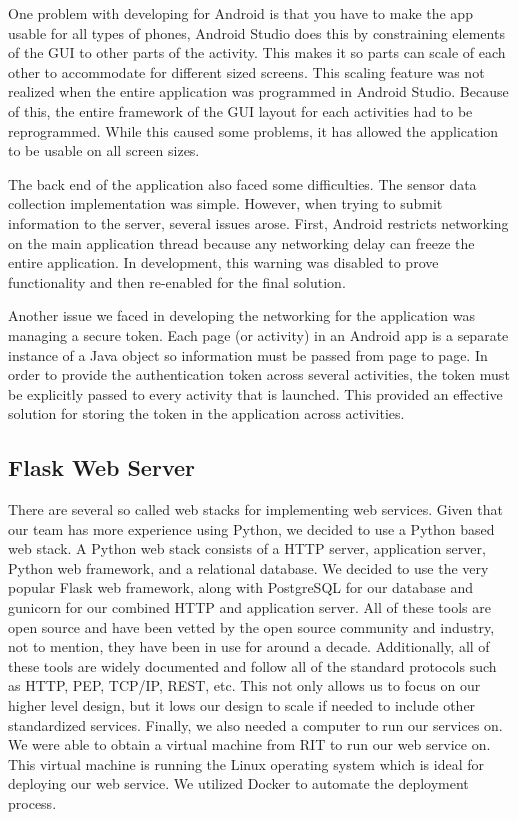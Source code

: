 \documentclass[conference]{IEEEtran}
\begin{document}
One problem with developing for Android is that you have to make the app usable for all types of phones, Android Studio does this by constraining elements of the GUI to other parts of the activity. This makes it so parts can scale of each other to accommodate for different sized screens. This scaling feature was not realized when the entire application was programmed in Android Studio. Because of this, the entire framework of the GUI layout for each activities had to be reprogrammed. While this caused some problems, it has allowed the application to be usable on all screen sizes.

The back end of the application also faced some difficulties. The sensor data collection implementation was simple. However, when trying to submit information to the server, several issues arose. First, Android restricts networking on the main application thread because any networking delay can freeze the entire application. In development, this warning was disabled to prove functionality and then re-enabled for the final solution. 

Another issue we faced in developing the networking for the application was managing a secure token. Each page (or activity) in an Android app is a separate instance of a Java object so information must be passed from page to page. In order to provide the authentication token across several activities, the token must be explicitly passed to every activity that is launched. This provided an effective solution for storing the token in the application across activities. 

\subsection{Flask Web Server}

There are several so called web stacks for implementing web services. Given that our team has more experience using Python, we decided to use a Python based web stack. A Python web stack consists of a HTTP server, application server, Python web framework, and a relational database. We decided to use the very popular Flask web framework, along with PostgreSQL for our database and gunicorn for our combined HTTP and application server. All of these tools are open source and have been vetted by the open source community and industry, not to mention, they have been in use for around a decade. Additionally, all of these tools are widely documented and follow all of the standard protocols such as HTTP, PEP, TCP/IP, REST, etc. This not only allows us to focus on our higher level design, but it 
lows our design to scale if needed to include other standardized services. Finally, we also needed a computer to run our services on. We were able to obtain a virtual machine from RIT to run our web service on. This virtual machine is running the Linux operating system which is ideal for deploying our web service. We utilized Docker to automate the deployment process.
\end{document}
